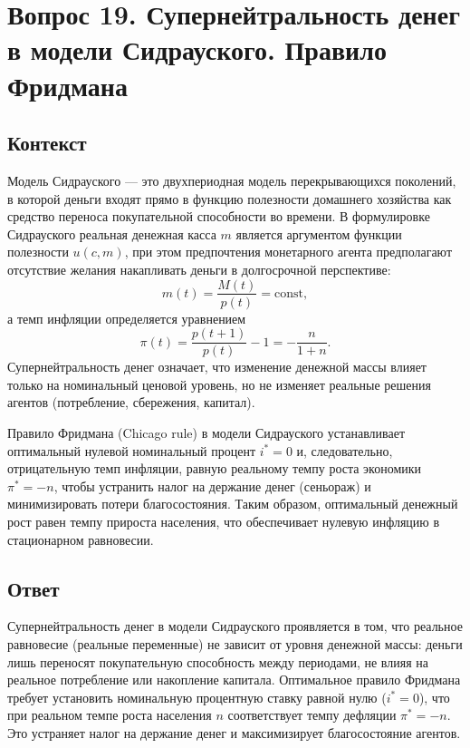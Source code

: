 \section*{Вопрос 19. Супернейтральность денег в модели Сидрауского. Правило Фридмана}

\subsection*{Контекст}
Модель Сидрауского — это двухпериодная модель перекрывающихся поколений, в которой деньги входят прямо в функцию полезности 
домашнего хозяйства как средство переноса покупательной способности во времени. В формулировке Сидрауского реальная
 денежная касса \(m\) является аргументом функции полезности \(u(c,m)\), при этом предпочтения монетарного агента 
 предполагают отсутствие желания накапливать деньги в долгосрочной перспективе: 
\[
m(t) = \frac{M(t)}{p(t)} = \text{const}, 
\]
а темп инфляции определяется уравнением 
\[
\pi(t) = \frac{p(t+1)}{p(t)} - 1 = -\frac{n}{1+n}.
\]
Супернейтральность денег означает, что изменение денежной массы влияет только на номинальный ценовой уровень, но
 не изменяет реальные решения агентов (потребление, сбережения, капитал).

Правило Фридмана (Chicago rule) в модели Сидрауского устанавливает оптимальный нулевой номинальный процент \(i^*=0\) и, 
следовательно, отрицательную темп инфляции, равную реальному темпу роста экономики \(\pi^*=-n\), чтобы устранить налог 
на держание денег (сеньораж) и минимизировать потери благосостояния. Таким образом, оптимальный денежный рост равен 
темпу прироста населения, что обеспечивает нулевую инфляцию в стационарном равновесии.

\subsection*{Ответ}
Супернейтральность денег в модели Сидрауского проявляется в том, что реальное равновесие (реальные переменные)  
не зависит от уровня денежной массы: деньги лишь переносят покупательную способность между периодами, не влияя
 на реальное потребление или накопление капитала. Оптимальное правило Фридмана требует установить номинальную 
 процентную ставку равной нулю (\(i^*=0\)), что при реальном темпе роста населения \(n\) соответствует темпу
  дефляции \(\pi^*=-n\). Это устраняет налог на держание денег и максимизирует благосостояние агентов. 